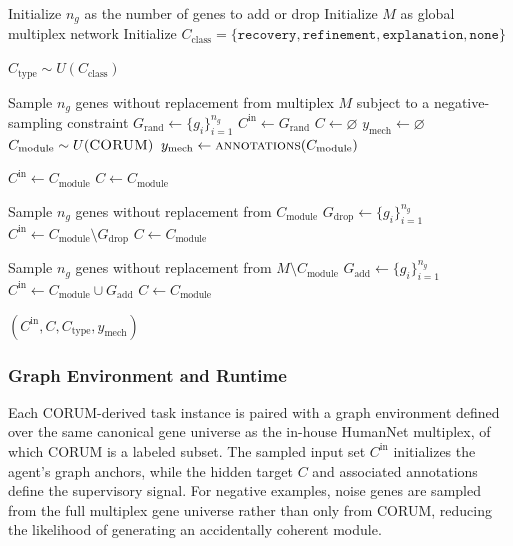\documentclass[thesis,letterpaper,12pt]{utthesis}
\begin{document}
\begin{algorithm}[t]
\caption{Creation of the CORUM-grounded training corpus}
\label{alg:corum-corpus}
\begin{algorithmic}[1]
\State Initialize $n_g$ as the number of genes to add or drop
\State Initialize $M$ as global multiplex network
\State Initialize $C_{\text{class}} = \{\texttt{recovery}, \texttt{refinement}, \texttt{explanation}, \texttt{none}\}$

\State $C_{\text{type}} \sim U(C_{\text{class}})$

    \State Sample $n_g$ genes without replacement from multiplex $M$ subject to a negative-sampling constraint
    \State $G_{\text{rand}} \gets \{g_i\}_{i=1}^{n_g}$
    \State $C^{\text{in}} \gets G_{\text{rand}}$
    \State $C \gets \varnothing$
    \State $y_{\text{mech}} \gets \varnothing$
\Else
    \State $C_{\text{module}} \sim U(\textsc{CORUM})$
    \State $y_{\text{mech}} \gets \textsc{annotations}(C_{\text{module}})$

        \State $C^{\text{in}} \gets C_{\text{module}}$
        \State $C \gets C_{\text{module}}$

        \State Sample $n_g$ genes without replacement from $C_{\text{module}}$
        \State $G_{\text{drop}} \gets \{g_i\}_{i=1}^{n_g}$
        \State $C^{\text{in}} \gets C_{\text{module}} \setminus G_{\text{drop}}$
        \State $C \gets C_{\text{module}}$

        \State Sample $n_g$ genes without replacement from $M \setminus C_{\text{module}}$
        \State $G_{\text{add}} \gets \{g_i\}_{i=1}^{n_g}$
        \State $C^{\text{in}} \gets C_{\text{module}} \cup G_{\text{add}}$
        \State $C \gets C_{\text{module}}$
    \EndIf
\EndIf

\State \Return $(C^{\text{in}}, C, C_{\text{type}}, y_{\text{mech}})$
\end{algorithmic}
\end{algorithm}

\subsubsection{Graph Environment and Runtime}\label{sec:graph-runtime}
Each CORUM-derived task instance is paired with a graph environment defined over the same canonical gene universe as the in-house HumanNet multiplex, of which CORUM is a labeled subset. The sampled input set $C^{\text{in}}$ initializes the agent's graph anchors, while the hidden target $C$ and associated annotations define the supervisory signal. For negative examples, noise genes are sampled from the full multiplex gene universe rather than only from CORUM, reducing the likelihood of generating an accidentally coherent module.
\end{document}
